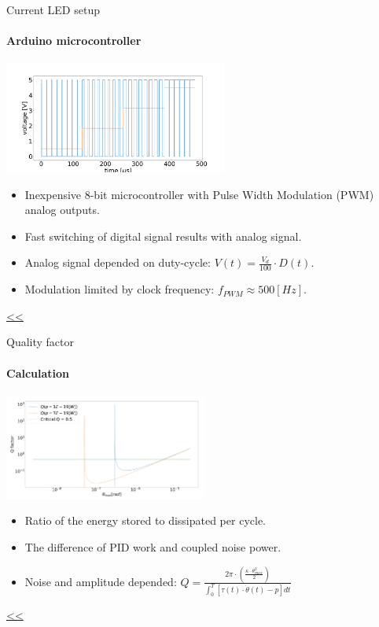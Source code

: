 \documentclass{beamer}
\begin{document}
\begin{frame}{\hypertarget{frame:Current LED setup 1}{Current LED setup}}
	\framesubtitle{Arduino microcontroller}
	\begin{center}		
		\includegraphics[width=0.55\textwidth,keepaspectratio]{duty_cycle.png}
	\end{center}
	\begin{itemize}		
		\item Inexpensive 8-bit microcontroller with Pulse Width Modulation (PWM) analog outputs.
		\item Fast switching of digital signal results with analog signal.
		\item Analog signal depended on duty-cycle: $V(t) =  \frac{V_d}{100}\cdot D(t)$.
		\item Modulation limited by clock frequency: $f_{PWM} \approx 500[Hz]$.
	\end{itemize}
	\hyperlink{frame:Current LED setup}{<<} 
\end{frame}

\begin{frame}{\hypertarget{frame:Quality factor 1}{Quality factor}}
	\framesubtitle{Calculation}
	\begin{center}		
		\includegraphics[width=0.5\textwidth,keepaspectratio]{Q factor.png}
	\end{center}
	\begin{itemize}			
		\item Ratio of the energy stored to dissipated per cycle.
		\item The difference of PID work and coupled noise power. 
		\item Noise and amplitude depended: $Q =  \frac{2\pi\cdot(\frac{\kappa\cdot\theta_{max}^2}{2})}{\int_0^T[\tau(t)\cdot\dot{\theta}(t) - p]dt} $
					
	\end{itemize}
	\hyperlink{frame:Quality factor}{<<} 

\end{frame}
\end{document}
